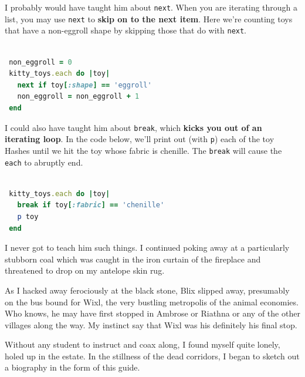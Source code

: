 \documentclass[10pt,twoside]{report}
\begin{document}
I probably would have taught him about
\lstinline[breaklines=true]|next|.  When you are iterating through a
list, you may use \lstinline[breaklines=true]|next| to {\bf skip on to
  the next item}.  Here we're counting toys that have a non-eggroll
shape by skipping those that do with
\lstinline[breaklines=true]|next|.


\begin{lstlisting}[basicstyle=\ttfamily\color{basiccolor},
    commentstyle = \ttfamily\color{commentcolor},
    keywordstyle=\ttfamily\color{keywordscolor},
    stringstyle=\color{stringcolor},
    language=Ruby,
    basicstyle=\small\ttfamily,
    showstringspaces=false,
  ]

 non_eggroll = 0
 kitty_toys.each do |toy|
   next if toy[:shape] == 'eggroll'
   non_eggroll = non_eggroll + 1
 end

\end{lstlisting}

I could also have taught him about \lstinline[breaklines=true]|break|,
which {\bf kicks you out of an iterating loop}. In the code below,
we'll print out (with \lstinline[breaklines=true]|p|) each of the toy
Hashes until we hit the toy whose fabric is chenille.  The
\lstinline[breaklines=true]|break| will cause the
\lstinline[breaklines=true]|each| to abruptly end.


\begin{lstlisting}[basicstyle=\ttfamily\color{basiccolor},
    commentstyle = \ttfamily\color{commentcolor},
    keywordstyle=\ttfamily\color{keywordscolor},
    stringstyle=\color{stringcolor},
    language=Ruby,
    basicstyle=\small\ttfamily,
    showstringspaces=false,
  ]

 kitty_toys.each do |toy|
   break if toy[:fabric] == 'chenille'
   p toy
 end

\end{lstlisting}

I never got to teach him such things.  I continued poking away at a
particularly stubborn coal which was caught in the iron curtain of the
fireplace and threatened to drop on my antelope skin rug.

As I hacked away ferociously at the black stone, Blix slipped away,
presumably on the bus bound for Wixl, the very bustling metropolis of
the animal economies.  Who knows, he may have first stopped in Ambrose
or Riathna or any of the other villages along the way.  My instinct
say that Wixl was his definitely his final stop.

Without any student to instruct and coax along, I found myself quite
lonely, holed up in the estate.  In the stillness of the dead
corridors, I began to sketch out a biography in the form of this
guide.
\end{document}
